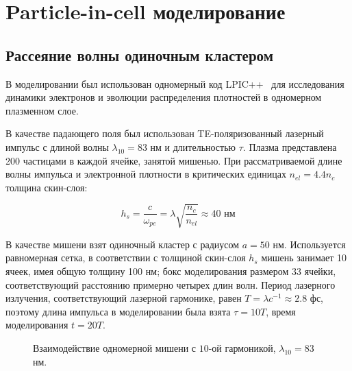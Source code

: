 \section{Particle-in-cell моделирование}

\subsection{Рассеяние волны одиночным кластером}

В моделировании был использован одномерный код LPIC++~\cite{Pfund1998} для исследования динамики электронов и эволюции распределения плотностей в одномерном плазменном слое.

В качестве падающего поля был использован TE-поляризованный лазерный импульс с длиной волны $\lambda_{10} = 83$ нм и длительностью $\tau$. Плазма представлена 200 частицами в каждой ячейке, занятой мишенью. При рассматриваемой длине волны импульса и электронной плотности в критических единицах $n_{el} = 4.4 n_c$ толщина скин-слоя:

    \begin{equation}
        h_{s} = \frac{c}{\omega_{pe}} = \lambda\sqrt{\frac{n_c}{n_{el}}} \approx40 \textrm{ нм} 
        \label{pic_skin_single}
    \end{equation}

В качестве мишени взят одиночный кластер с радиусом $a = 50$ нм. Используется равномерная сетка, в соответствии с толщиной скин-слоя $h_{s}$ мишень занимает 10 ячеек, имея общую толщину 100 нм; бокс моделирования размером 33 ячейки, соответствующий расстоянию примерно четырех длин волн. Период лазерного излучения, соответствующий лазерной гармонике, равен $T = \lambda c^{-1} \approx 2.8$ фс, поэтому длина импульса в моделировании была взята $\tau = 10T$, время моделирования $t = 20T$. 

    \begin{figure}[htb]
        \caption{Взаимодействие одномерной мишени с $10$-ой гармоникой, $\lambda_{10} = 83$ нм.}\label{lpic_low_high:image}
    \end{figure}

